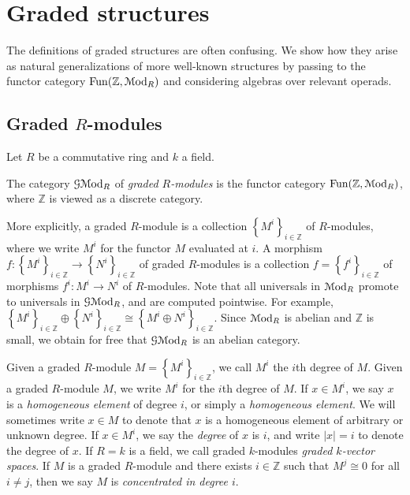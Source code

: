\chapter{Graded structures}\label{ch:1}



The definitions of graded structures are often confusing. We show how they arise as natural generalizations of more well-known structures by passing to the functor category $\operatorname{Fun}(\mathbb{Z} ,\mathcal{M}\mathrm{od} _R)$ and considering algebras over relevant operads.

\section{Graded $R$-modules}\label{sec:1.1}

Let $R$ be a commutative ring and $k$ a field.

\begin{definition}\label{1.1.1}
	The category $\mathcal{G} \mathcal{M}\mathrm{od}_R$ of \emph{graded $R$-modules} is the functor category $\operatorname{Fun}(\mathbb{Z} ,\mathcal{M}\mathrm{od} _R)$, where $\mathbb{Z} $ is viewed as a discrete category.
\end{definition}

\begin{remark}\label{1.1.2}
	More explicitly, a graded $R$-module is a collection $\left\{ M^i \right\} _{i\in\mathbb{Z} } $ of $R$-modules, where we write $M^i$ for the functor $M$ evaluated at $i$. A morphism $f : \left\{ M^i \right\} _{i\in\mathbb{Z} }  \to \left\{ N^i \right\} _{i\in\mathbb{Z} } $ of graded $R$-modules is a collection $f=\left\{ f^i \right\} _{i\in\mathbb{Z} } $ of morphisms $f^i : M^i \to N^i$ of $R$-modules. Note that all universals in $\mathcal{M}\mathrm{od} _R$ promote to universals in $\mathcal{G} \mathcal{M}\mathrm{od} _R$, and are computed pointwise. For example, $\left\{ M^i \right\} _{i\in\mathbb{Z} } \oplus \left\{ N^i \right\} _{i\in\mathbb{Z} } \cong \left\{ M^i\oplus N^i \right\}_{i\in\mathbb{Z} } $. Since $\mathcal{M}\mathrm{od} _R$ is abelian and $\mathbb{Z} $ is small, we obtain for free that $\mathcal{G} \mathcal{M}\mathrm{od} _R$ is an abelian category.
\end{remark}

\begin{terminology}\label{1.1.3}
	Given a graded $R$-module $M=\left\{ M^i \right\} _{i\in\mathbb{Z} } $, we call $M^i$ the $i$th degree of $M$. Given a graded $R$-module $M$, we write $M^i$ for the $i$th degree of $M$. If $x\in M^i$, we say $x$ is a \emph{homogeneous element} of degree $i$, or simply a \emph{homogeneous element}. We will sometimes write $x\in M$ to denote that $x$ is a homogeneous element of arbitrary or unknown degree. If $x\in M^i$, we say the \emph{degree} of $x$ is $i$, and write $\left| x \right| =i$ to denote the degree of $x$. If $R=k$ is a field, we call graded $k$-modules \emph{graded $k$-vector spaces}. If $M$ is a graded $R$-module and there exists $i\in\mathbb{Z} $ such that $M^j \cong 0$ for all $i\neq j$, then we say $M$ is \emph{concentrated in degree $i$}.
\end{terminology}

